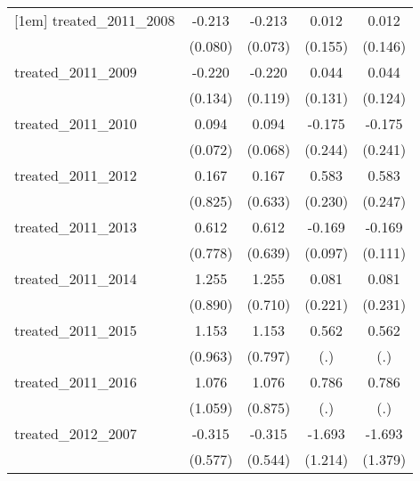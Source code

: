 {\begin{tabular}{l*{4}{c}}
[1em]
treated\_2011\_2008&      -0.213\sym{**} &      -0.213\sym{**} &       0.012         &       0.012         \\
            &     (0.080)         &     (0.073)         &     (0.155)         &     (0.146)         \\
[1em]
treated\_2011\_2009&      -0.220         &      -0.220         &       0.044         &       0.044         \\
            &     (0.134)         &     (0.119)         &     (0.131)         &     (0.124)         \\
[1em]
treated\_2011\_2010&       0.094         &       0.094         &      -0.175         &      -0.175         \\
            &     (0.072)         &     (0.068)         &     (0.244)         &     (0.241)         \\
[1em]
treated\_2011\_2012&       0.167         &       0.167         &       0.583\sym{*}  &       0.583\sym{*}  \\
            &     (0.825)         &     (0.633)         &     (0.230)         &     (0.247)         \\
[1em]
treated\_2011\_2013&       0.612         &       0.612         &      -0.169         &      -0.169         \\
            &     (0.778)         &     (0.639)         &     (0.097)         &     (0.111)         \\
[1em]
treated\_2011\_2014&       1.255         &       1.255         &       0.081         &       0.081         \\
            &     (0.890)         &     (0.710)         &     (0.221)         &     (0.231)         \\
[1em]
treated\_2011\_2015&       1.153         &       1.153         &       0.562         &       0.562         \\
            &     (0.963)         &     (0.797)         &         (.)         &         (.)         \\
[1em]
treated\_2011\_2016&       1.076         &       1.076         &       0.786         &       0.786         \\
            &     (1.059)         &     (0.875)         &         (.)         &         (.)         \\
[1em]
treated\_2012\_2007&      -0.315         &      -0.315         &      -1.693         &      -1.693         \\
            &     (0.577)         &     (0.544)         &     (1.214)         &     (1.379)         \\

\end{tabular}}
